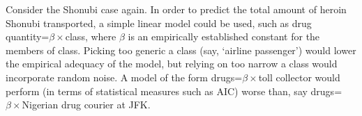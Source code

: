 \documentclass{article}
\begin{document}
%	
Consider the Shonubi case again. In order to predict the total amount of heroin Shonubi transported, a simple linear model could be used, such as \textsf{drug quantity}=$\beta \times$\textsf{class}, where $\beta$ is an empirically established constant for the members of \textsf{class}. Picking too generic a class (say, `airline passenger') would lower the empirical adequacy of the model, but relying on too narrow a class would incorporate random noise. A model of the form \textsf{drugs}=$\beta \times$\textsf{toll collector} would perform (in terms of statistical measures  such as AIC) worse than, say \textsf{drugs}=$\beta \times$\textsf{Nigerian drug courier at JFK}. 



	
	
\end{document}

